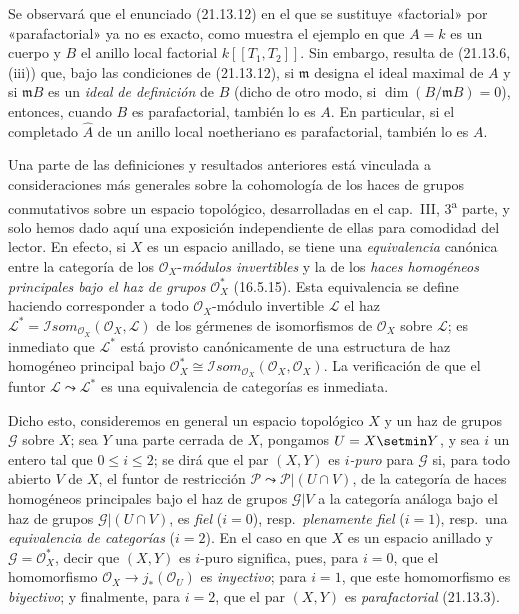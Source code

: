 \begin{env}[21.13.12.1]
\label{IV.21.13.12.1}
Se observará que el enunciado (21.13.12) en el que se sustituye «factorial» por «parafactorial»
ya no es exacto, como muestra el ejemplo en que $A=k$ es un cuerpo y $B$ el anillo
local factorial $k[[T_1,T_2]]$. Sin embargo, resulta de (21.13.6, (iii)) que, bajo
las condiciones de (21.13.12), si $\mathfrak m$ designa el ideal maximal de $A$ y si
$\mathfrak mB$ es un \emph{ideal}
\emph{de definición} de $B$ (dicho de otro modo, si $\dim(B/\mathfrak mB)=0$), entonces,
cuando $B$ es parafactorial, también lo es $A$. En particular, si el
completado $\widehat A$ de un anillo local noetheriano es parafactorial, también lo es
$A$.
\end{env}

\begin{remark}[21.13.13]
\label{IV.21.13.13}
Una parte de las definiciones y resultados anteriores está vinculada a consideraciones
más generales sobre la cohomología de los haces de grupos conmutativos sobre un espacio
topológico, desarrolladas en el cap.~III, 3\textsuperscript{a} parte, y solo hemos
dado aquí una exposición independiente de ellas para comodidad del lector. En efecto, si $X$
es un espacio anillado, se tiene una \emph{equivalencia} canónica entre la categoría de los
$\mathcal O_X$-\emph{módulos invertibles} y la de los \emph{haces homogéneos principales
bajo el haz de grupos} $\mathcal O_X^*$ (16.5.15). Esta equivalencia se define
haciendo corresponder a todo $\mathcal O_X$-módulo invertible $\mathscr L$ el
haz $\mathscr L^*=\mathscr Isom_{\mathcal O_X}(\mathcal O_X,\mathscr L)$ de los
gérmenes de isomorfismos de $\mathcal O_X$ sobre $\mathscr L$; es inmediato que
$\mathscr L^*$ está provisto canónicamente de una estructura de haz homogéneo principal
bajo $\mathcal O_X^*\cong\mathscr Isom_{\mathcal O_X}(\mathcal O_X,\mathcal O_X)$.
La verificación de que el funtor $\mathscr L\leadsto\mathscr L^*$ es una
equivalencia de categorías es inmediata.

Dicho esto, consideremos en general un espacio topológico $X$ y un haz de
grupos $\mathscr G$ sobre $X$; sea $Y$ una parte cerrada de $X$, pongamos $U=X\setmin Y$, y
sea $i$ un entero tal que $0\leq i\leq2$; se dirá que el par $(X,Y)$ es
\emph{$i$-puro} para $\mathscr G$ si, para todo abierto $V$ de $X$, el funtor de
restricción $\mathscr P\leadsto\mathscr P|(U\cap V)$, de la categoría de haces
homogéneos principales bajo el haz de grupos $\mathscr G|V$ a la categoría
análoga bajo el haz de grupos $\mathscr G|(U\cap V)$, es \emph{fiel}
($i=0$), resp.\ \emph{plenamente fiel} ($i=1$), resp.\ una \emph{equivalencia de
categorías} ($i=2$). En el caso en que $X$ es un espacio anillado y
$\mathscr G=\mathcal O_X^*$, decir que $(X,Y)$ es $i$-puro significa, pues, para $i=0$,
que el homomorfismo $\mathcal O_X\to j_*(\mathcal O_U)$ es \emph{inyectivo}; para
$i=1$, que este homomorfismo es \emph{biyectivo}; y finalmente, para $i=2$, que el par
$(X,Y)$ es \emph{parafactorial} (21.13.3).


\end{remark}
